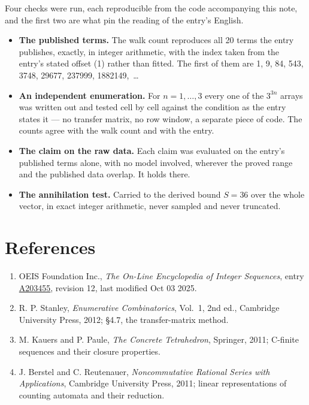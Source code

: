 \documentclass[11pt]{article}
\theoremstyle{definition}
\begin{document}
Four checks were run, each reproducible from the code accompanying this note, and the first two are what pin the reading of the entry's English.

\begin{itemize}

\item {\bfseries The published terms.} The walk count reproduces all 20 terms the entry publishes, exactly, in integer arithmetic, with the index taken from the entry's stated offset (1) rather than fitted. The first of them are 1, 9, 84, 543, 3748, 29677, 237999, 1882149,~\dots

\item {\bfseries An independent enumeration.} For $n = 1,\dots,3$ every one of the $3^{3n}$ arrays was written out and tested cell by cell against the condition as the entry states it --- no transfer matrix, no row window, a separate piece of code. The counts agree with the walk count and with the entry.

\item {\bfseries The claim on the raw data.} Each claim was evaluated on the entry's published terms alone, with no model involved, wherever the proved range and the published data overlap. It holds there.

\item {\bfseries The annihilation test.} Carried to the derived bound $S = 36$ over the whole vector, in exact integer arithmetic, never sampled and never truncated.

\end{itemize}

\section{References}

\begin{enumerate}

\item OEIS Foundation Inc., \emph{The On-Line Encyclopedia of Integer Sequences}, entry \href{https://oeis.org/A203455}{A203455}, revision 12, last modified Oct 03 2025.

\item R. P. Stanley, \emph{Enumerative Combinatorics}, Vol.~1, 2nd ed., Cambridge University Press, 2012; \S4.7, the transfer-matrix method.

\item M. Kauers and P. Paule, \emph{The Concrete Tetrahedron}, Springer, 2011; C-finite sequences and their closure properties.

\item J. Berstel and C. Reutenauer, \emph{Noncommutative Rational Series with Applications}, Cambridge University Press, 2011; linear representations of counting automata and their reduction.

\end{enumerate}
\end{document}
